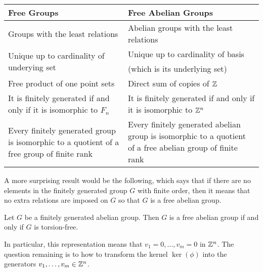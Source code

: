 \documentclass[a4paper]{article}
\begin{document}
\begin{table}[!ht]
\centering
\begin{tabular}{p{8cm}|p{8cm}}
Free Groups                                                                               & Free Abelian Groups                                                                                       \\[1.5ex] \hline\hline
Groups with the least relations                                                           & Abelian groups with the least relations                                                                   \\[1.5ex]\hline
\multirow{2}{*}{Unique up to cardinality of underying set}                                & Unique up to cardinality of basis                                                                         \\
                                                                                          & (which is its underlying set)                                                                             \\\hline
Free product of one point sets                                                            & Direct sum of copies of $\mathbb{Z}$                                                                              \\[1.5ex]\hline
It is finitely generated if and only if it is isomorphic to $F_n$                         & It is finitely generated if and only if it is isomorphic to $\mathbb{Z}^n$                                        \\[1.5ex]\hline
Every finitely generated group is isomorphic to a quotient of a free group of finite rank & Every finitely generated abelian group is isomorphic to a quotient of a free abelian group of finite rank
\end{tabular}
\end{table}

A more surprising result would be the following, which says that if there are no elements in the finitely generated group $G$ with finite order, then it means that no extra relations are imposed on $G$ so that $G$ is a free abelian group. 

\begin{prp}{}{} Let $G$ be a finitely generated abelian group. Then $G$ is a free abelian group if and only if $G$ is torsion-free. 
\end{prp}

In particular, this representation means that $v_1=0,\dots,v_m=0$ in $\mathbb{Z}^n$. The question remaining is to how to transform the kernel $\ker(\phi)$ into the generators $v_1,\dots,v_m\in\mathbb{Z}^n$. 
\end{document}
